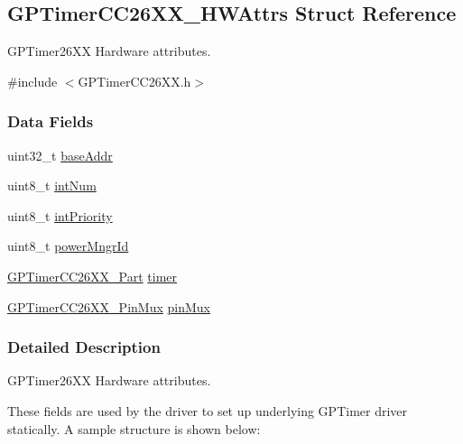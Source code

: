 \subsection{G\+P\+Timer\+C\+C26\+X\+X\+\_\+\+H\+W\+Attrs Struct Reference}
\label{struct_g_p_timer_c_c26_x_x___h_w_attrs}


G\+P\+Timer26\+X\+X Hardware attributes.  




{\ttfamily \#include $<$G\+P\+Timer\+C\+C26\+X\+X.\+h$>$}

\subsubsection*{Data Fields}
\begin{DoxyCompactItemize}
\item 
uint32\+\_\+t \hyperlink{struct_g_p_timer_c_c26_x_x___h_w_attrs_ad6bc77822c89ec42d268a29178d81828}{base\+Addr}
\item 
uint8\+\_\+t \hyperlink{struct_g_p_timer_c_c26_x_x___h_w_attrs_af8a6cce8af13c52e964b65ac2f8fa9f3}{int\+Num}
\item 
uint8\+\_\+t \hyperlink{struct_g_p_timer_c_c26_x_x___h_w_attrs_a83fbce47b4ff591bde69b5f77d2c133e}{int\+Priority}
\item 
uint8\+\_\+t \hyperlink{struct_g_p_timer_c_c26_x_x___h_w_attrs_a3772ec5a7f529047ed690c83cffad038}{power\+Mngr\+Id}
\item 
\hyperlink{_g_p_timer_c_c26_x_x_8h_aff5462fa33c306f2c8bd29284fd898b0}{G\+P\+Timer\+C\+C26\+X\+X\+\_\+\+Part} \hyperlink{struct_g_p_timer_c_c26_x_x___h_w_attrs_a85c14724ff57d1b25d6552752293d7fc}{timer}
\item 
\hyperlink{_g_p_timer_c_c26_x_x_8h_ab4a2e82c659e0ea1fa2ae7a852298359}{G\+P\+Timer\+C\+C26\+X\+X\+\_\+\+Pin\+Mux} \hyperlink{struct_g_p_timer_c_c26_x_x___h_w_attrs_a7a5f3ba89a0094ead820cc15f9465ed5}{pin\+Mux}
\end{DoxyCompactItemize}


\subsubsection{Detailed Description}
G\+P\+Timer26\+X\+X Hardware attributes. 

These fields are used by the driver to set up underlying G\+P\+Timer driver statically. A sample structure is shown below\+:


